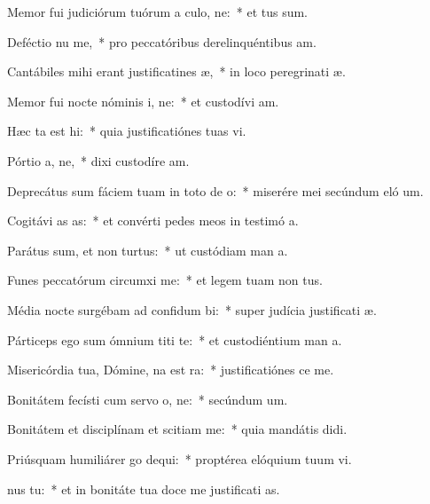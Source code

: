 \item Memor fui judiciórum tuórum a culo, ne:~* et tus sum.
\item Deféctio nu me,~* pro peccatóribus derelinquéntibus  am.
\item Cantábiles mihi erant justificatines æ,~* in loco peregrinati æ.
\item Memor fui nocte nóminis i, ne:~* et custodívi  am.
\item Hæc ta est hi:~* quia justificatiónes tuas vi.
\item Pórtio a, ne,~* dixi custodíre  am.
\item Deprecátus sum fáciem tuam in toto de o:~* miserére mei secúndum eló um.
\item Cogitávi as as:~* et convérti pedes meos in testimó a.
\item Parátus sum, et non  turtus:~* ut custódiam man a.
\item Funes peccatórum circumxi  me:~* et legem tuam non  tus.
\item Média nocte surgébam ad confidum bi:~* super judícia justificati æ.
\item Párticeps ego sum ómnium titi te:~* et custodiéntium man a.
\item Misericórdia tua, Dómine, na est ra:~* justificatiónes  ce me.
\item Bonitátem fecísti cum servo o, ne:~* secúndum  um.
\item Bonitátem et disciplínam et scitiam  me:~* quia mandátis  didi.
\item Priúsquam humiliárer go dequi:~* proptérea elóquium tuum vi.
\item {}nus  tu:~* et in bonitáte tua doce me justificati as.
